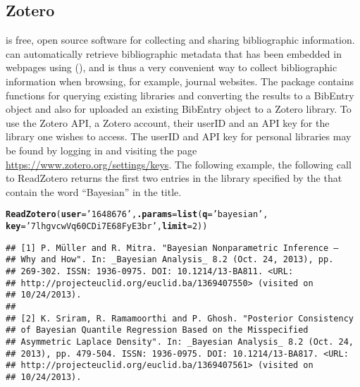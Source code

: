 \documentclass[article]{jss}\usepackage[]{graphicx}\usepackage[]{color}
\makeatletter
\newcommand{\hlnum}[1]{\textcolor[rgb]{0.125,0.125,1}{#1}}%
\newcommand{\hlstr}[1]{\textcolor[rgb]{0.125,0.125,1}{#1}}%
\newcommand{\hlstd}[1]{\textcolor[rgb]{0.251,0.251,0.282}{#1}}%
\newcommand{\hlkwc}[1]{\textcolor[rgb]{0.529,0,0.184}{\textbf{#1}}}%
\newcommand{\hlkwd}[1]{\textcolor[rgb]{0.251,0.251,0.282}{\textbf{#1}}}%
\newenvironment{kframe}{%
 \def\at@end@of@kframe{}%
 \ifinner\ifhmode%
  \def\at@end@of@kframe{\end{minipage}}%
  \begin{minipage}{\columnwidth}%
 \fi\fi%
 \def\FrameCommand##1{\hskip\@totalleftmargin \hskip-\fboxsep
 \colorbox{shadecolor}{##1}\hskip-\fboxsep
     \hskip-\linewidth \hskip-\@totalleftmargin \hskip\columnwidth}%
 \MakeFramed {\advance\hsize-\width
   \@totalleftmargin\z@ \linewidth\hsize
   \@setminipage}}%
 {\par\unskip\endMakeFramed%
 \at@end@of@kframe}
\newenvironment{knitrout}{}{} %
\newcommand{\ourpkg}{\pkg{RefManageR}}
\makeatother
\begin{document}
\subsection{Zotero}
 is free, open source software for collecting and sharing bibliographic information.   can automatically retrieve bibliographic metadata that has been embedded in webpages using  (), and is thus a very convenient way to collect bibliographic information when browsing, for example, journal websites.  The \ourpkg{} package contains functions for querying existing  libraries and converting the results to a BibEntry object and also for uploaded an existing BibEntry object to a Zotero library.  To use the Zotero API, a Zotero account, their userID and an API key for the library one wishes to access.  The userID and API key for personal libraries may be found by logging in and visiting the page \url{https://www.zotero.org/settings/keys}.  The following example, the following call to ReadZotero returns the first two entries in the library specified by the  that contain the word ``Bayesian'' in the title.
\begin{knitrout}
\color{fgcolor}\begin{kframe}
\begin{alltt}
\hlkwd{ReadZotero}\hlstd{(}\hlkwc{user} \hlstd{=} \hlstr{'1648676'}\hlstd{,} \hlkwc{.params} \hlstd{=} \hlkwd{list}\hlstd{(}\hlkwc{q} \hlstd{=} \hlstr{'bayesian'}\hlstd{,}
                               \hlkwc{key} \hlstd{=} \hlstr{'7lhgvcwVq60CDi7E68FyE3br'}\hlstd{,} \hlkwc{limit} \hlstd{=} \hlnum{2}\hlstd{))}
\end{alltt}
\begin{verbatim}
## [1] P. Müller and R. Mitra. "Bayesian Nonparametric Inference –
## Why and How". In: _Bayesian Analysis_ 8.2 (Oct. 24, 2013), pp.
## 269-302. ISSN: 1936-0975. DOI: 10.1214/13-BA811. <URL:
## http://projecteuclid.org/euclid.ba/1369407550> (visited on
## 10/24/2013).
## 
## [2] K. Sriram, R. Ramamoorthi and P. Ghosh. "Posterior Consistency
## of Bayesian Quantile Regression Based on the Misspecified
## Asymmetric Laplace Density". In: _Bayesian Analysis_ 8.2 (Oct. 24,
## 2013), pp. 479-504. ISSN: 1936-0975. DOI: 10.1214/13-BA817. <URL:
## http://projecteuclid.org/euclid.ba/1369407561> (visited on
## 10/24/2013).
\end{verbatim}
\end{kframe}
\end{knitrout}
\end{document}
